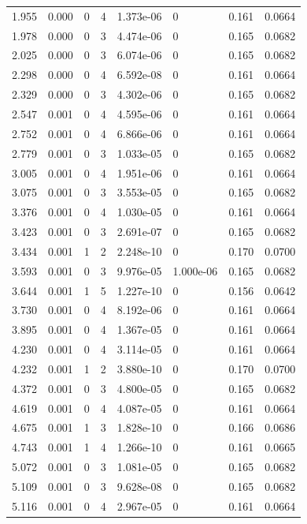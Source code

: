 \documentclass[preview]{standalone}
\begin{document}
{{\begin{tabular}{L{1.2cm}C{1.2cm} C{0.3cm}C{0.5cm} C{1.4cm}C{1.4cm} C{1.4cm}C{1.4cm}}
  1.955  &  0.000  & 0     &  4 &  1.373e-06  & 0  & 0.161 &  0.0664   \\ 
  1.978  &  0.000  & 0     &  3 &  4.474e-06  & 0  & 0.165 &  0.0682   \\ 
  2.025  &  0.000  & 0     &  3 &  6.074e-06  & 0  & 0.165 &  0.0682   \\ 
  2.298  &  0.000  & 0     &  4 &  6.592e-08  & 0  & 0.161 &  0.0664   \\ 
  2.329  &  0.000  & 0     &  3 &  4.302e-06  & 0  & 0.165 &  0.0682   \\ 
  2.547  &  0.001  & 0     &  4 &  4.595e-06  & 0  & 0.161 &  0.0664   \\ 
  2.752  &  0.001  & 0     &  4 &  6.866e-06  & 0  & 0.161 &  0.0664   \\ 
  2.779  &  0.001  & 0     &  3 &  1.033e-05  & 0  & 0.165 &  0.0682   \\ 
  3.005  &  0.001  & 0     &  4 &  1.951e-06  & 0  & 0.161 &  0.0664   \\ 
  3.075  &  0.001  & 0     &  3 &  3.553e-05  & 0  & 0.165 &  0.0682   \\ 
  3.376  &  0.001  & 0     &  4 &  1.030e-05  & 0  & 0.161 &  0.0664   \\ 
  3.423  &  0.001  & 0     &  3 &  2.691e-07  & 0  & 0.165 &  0.0682   \\ 
  3.434  &  0.001  & 1     &  2 &  2.248e-10  & 0  & 0.170 &  0.0700   \\ 
  3.593  &  0.001  & 0     &  3 &  9.976e-05  & 1.000e-06  & 0.165 &  0.0682   \\ 
  3.644  &  0.001  & 1     &  5 &  1.227e-10  & 0  & 0.156 &  0.0642   \\ 
  3.730  &  0.001  & 0     &  4 &  8.192e-06  & 0  & 0.161 &  0.0664   \\ 
  3.895  &  0.001  & 0     &  4 &  1.367e-05  & 0  & 0.161 &  0.0664   \\ 
  4.230  &  0.001  & 0     &  4 &  3.114e-05  & 0  & 0.161 &  0.0664   \\ 
  4.232  &  0.001  & 1     &  2 &  3.880e-10  & 0  & 0.170 &  0.0700   \\ 
  4.372  &  0.001  & 0     &  3 &  4.800e-05  & 0  & 0.165 &  0.0682   \\ 
  4.619  &  0.001  & 0     &  4 &  4.087e-05  & 0  & 0.161 &  0.0664   \\ 
  4.675  &  0.001  & 1     &  3 &  1.828e-10  & 0  & 0.166 &  0.0686   \\ 
  4.743  &  0.001  & 1     &  4 &  1.266e-10  & 0  & 0.161 &  0.0665   \\ 
  5.072  &  0.001  & 0     &  3 &  1.081e-05  & 0  & 0.165 &  0.0682   \\ 
  5.109  &  0.001  & 0     &  3 &  9.628e-08  & 0  & 0.165 &  0.0682   \\ 
  5.116  &  0.001  & 0     &  4 &  2.967e-05  & 0  & 0.161 &  0.0664   \\ 
\hline 
\end{tabular} 

}}
\end{document}
